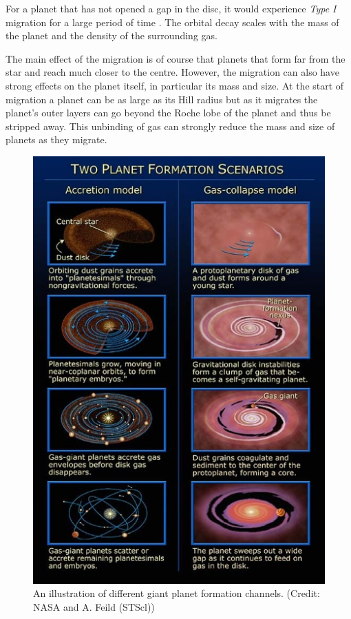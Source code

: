 \documentclass[twocolumn]{aastex631}
\begin{document}
For a planet that has not opened a gap in the disc, it would experience \textit{Type I} migration for a large period of time \citep{Baruteau+2011}. The orbital decay scales with the mass of the planet and the density of the surrounding gas.

The main effect of the migration is of course that planets that form far from the star and reach much closer to the centre. However, the migration can also have strong effects on the planet itself, in particular its mass and size. At the start of migration a planet can be as large as its Hill radius but as it migrates the planet's outer layers can go beyond the Roche lobe of the planet and thus be stripped away. This unbinding of gas can strongly reduce the mass and size of planets as they migrate.

\begin{figure}[htb]
    \centering
    \includegraphics[width=\columnwidth]{channels_illustration.jpg}
    \caption{An illustration of different giant planet formation channels. (Credit: NASA and A. Feild (STScl))}
    \label{fig:formation_diagram}
\end{figure}
\end{document}
